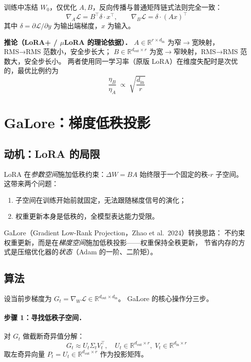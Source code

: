 \documentclass[12pt, a4paper]{article}
\begin{document}
训练中冻结 $W_0$，仅优化 $A, B$，反向传播与普通矩阵链式法则完全一致：
\[
  \nabla_A \mathcal{L} = B^\top \delta \cdot x^\top,
  \qquad
  \nabla_B \mathcal{L} = \delta \cdot (Ax)^\top
\]
其中 $\delta = \partial\mathcal{L}/\partial y$ 为输出端梯度，$x$ 为输入。

\begin{propbox}
\textbf{推论（LoRA+ / $\mu$LoRA 的理论依据）．}
$A \in \mathbb{R}^{r\times d_{\mathrm{in}}}$ 为窄$\to$宽映射，RMS→RMS 范数小，安全步长大；
$B \in \mathbb{R}^{d_{\mathrm{out}}\times r}$ 为宽$\to$窄映射，RMS→RMS 范数大，安全步长小。
两者使用同一学习率（原版 LoRA）在维度失配时是次优的，最优比例约为
\[
  \frac{\eta_B}{\eta_A} \;\propto\; \sqrt{\frac{d_{\mathrm{in}}}{r}}
\]
\end{propbox}

\section{GaLore：梯度低秩投影}
\label{sec:galore}

\subsection{动机：LoRA 的局限}

LoRA 在\emph{参数空间}施加低秩约束：$\Delta W = BA$ 始终限于一个固定的秩-$r$ 子空间。
这带来两个问题：
\begin{enumerate}
  \item 子空间在训练开始前就固定，无法跟随梯度信号的演化；
  \item 权重更新本身是低秩的，全模型表达能力受限。
\end{enumerate}

GaLore（Gradient Low-Rank Projection，Zhao et al.\ 2024）转换思路：
不约束权重更新，而是在\emph{梯度空间}施加低秩投影——权重保持全秩更新，
节省内存的方式是压缩优化器的\emph{状态}（Adam 的一阶、二阶矩）。

\subsection{算法}

设当前步梯度为 $G_t = \nabla_{W} \mathcal{L} \in \mathbb{R}^{d_{\mathrm{out}} \times d_{\mathrm{in}}}$。
GaLore 的核心操作分三步。

\paragraph{步骤 1：寻找低秩子空间．}
对 $G_t$ 做截断奇异值分解：
\[
  G_t \approx U_t \Sigma_t V_t^\top,
  \quad U_t \in \mathbb{R}^{d_{\mathrm{out}}\times r},\;
  V_t \in \mathbb{R}^{d_{\mathrm{in}}\times r}
\]
取左奇异向量 $P_t = U_t \in \mathbb{R}^{d_{\mathrm{out}}\times r}$ 作为投影矩阵。
\end{document}
